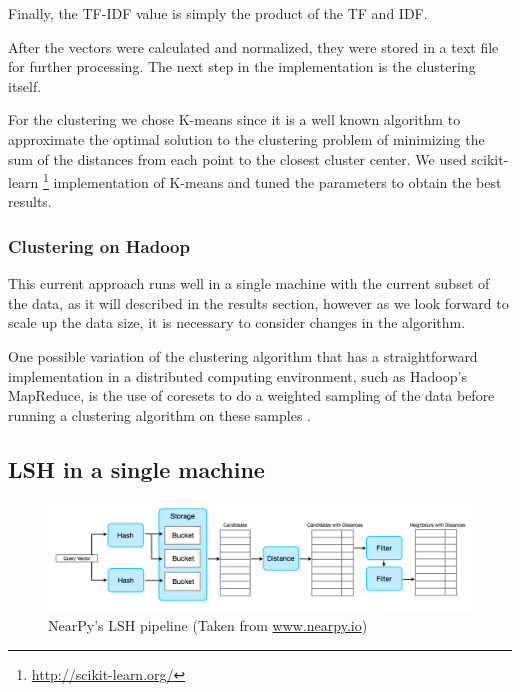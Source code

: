 \documentclass[10pt,a4paper]{scrartcl}
\begin{document}
      Finally, the TF-IDF value is simply the product of the TF and IDF.
      
      After the vectors were calculated and normalized, they were stored in
      a text file for further processing. The next step in the implementation
      is the clustering itself.
      
      For the clustering we chose K-means since it is a well known algorithm
      to approximate the optimal solution to the clustering problem
      of minimizing the sum of the distances from each point to the closest
      cluster center. We used scikit-learn
      \footnote{\url{http://scikit-learn.org/}} implementation of K-means and
      tuned the parameters to obtain the best results.

      \subsubsection{Clustering on Hadoop}
      \label{sec:implementation:subsec:hadoop}
        This current approach runs well in a single machine with the current
        subset of the data, as it will described in the results section,
        however as we look forward to scale up the data size, it is necessary
        to consider changes in the algorithm.
        
        One possible variation of the clustering algorithm that has a
        straightforward implementation in a distributed computing environment,
        such as Hadoop's MapReduce, is the use of coresets to do a weighted
        sampling of the data before running a clustering algorithm on these
        samples \cite{feldman2011scalable}.
    \subsection{LSH in a single machine}
      \begin{figure}[htbp]
 	      \centering
	      \includegraphics[scale=0.4]{img/lsh_pipeline.png}
 	      \caption{NearPy's LSH pipeline (Taken from \url{www.nearpy.io})}
	      \label{figure:lsh_pipeline}
      \end{figure}
      
\end{document}
